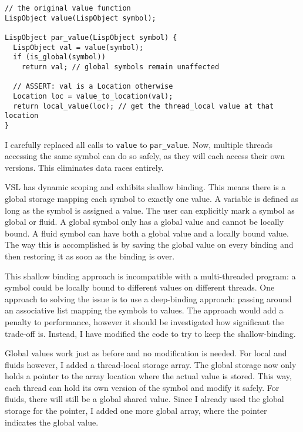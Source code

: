 \begin{verbatim}
// the original value function
LispObject value(LispObject symbol);

LispObject par_value(LispObject symbol) {
  LispObject val = value(symbol);
  if (is_global(symbol))
    return val; // global symbols remain unaffected

  // ASSERT: val is a Location otherwise
  Location loc = value_to_location(val);
  return local_value(loc); // get the thread_local value at that location
}
\end{verbatim}

I carefully replaced all calls to \texttt{value} to \texttt{par\_value}. Now, multiple threads accessing the same symbol
can do so safely, as they will each access their own versions. This eliminates data races entirely.


VSL has dynamic scoping and exhibits shallow binding. This means there is a global
storage mapping each symbol to exactly one value. A variable is defined as long
as the symbol is assigned a value. The user can explicitly mark a symbol as global
or fluid. A global symbol only has a global value and cannot be locally bound.
A fluid symbol can have both a global value and a locally bound value. The way this
is accomplished is by saving the global value on every binding and then restoring it
as soon as the binding is over.

This shallow binding approach is incompatible with a multi-threaded program: a symbol
could be locally bound to different values on different threads. One approach to solving the
issue is to use a deep-binding approach: passing around an associative list mapping the symbols
to values. The approach would add a penalty to performance, however it should be investigated
how significant the trade-off is. Instead, I have modified the code to try to keep the
shallow-binding.

Global values work just as before and no modification is needed. For local and
fluids however, I added a thread-local storage array. The global storage now only
holds a pointer to the array location where the actual value is stored. This way, each thread can
hold its own version of the symbol and modify it safely. For fluids, there will still be a global
shared value. Since I already used the global storage for the pointer, I added one more global
array, where the pointer indicates the global value.

